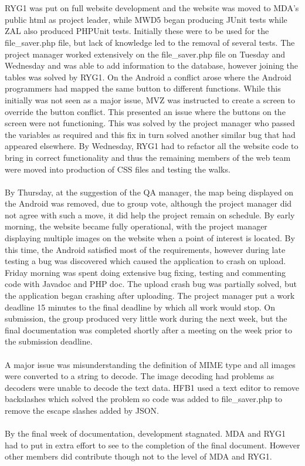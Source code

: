 \documentclass[12pt]{article}
\begin{document}
\\\\
RYG1 was put on full website development and the website was moved to MDA's public html as project leader, while MWD5 began producing JUnit tests while ZAL also produced PHPUnit tests. Initially these were to be used for the file\_saver.php file, but lack of knowledge led to the removal of several tests. The project manager worked extensively on the file\_saver.php file on Tuesday and Wednesday and was able to add information to the database, however joining the tables was solved by RYG1. On the Android a conflict arose where the Android programmers had mapped the same button to different functions. While this initially was not seen as a major issue, MVZ was instructed to create a screen to override the button conflict. This presented an issue where the buttons on the screen were not functioning. This was solved by the project manager who passed the variables as required and this fix in turn solved another similar bug that had appeared elsewhere. By Wednesday, RYG1 had to refactor all the website code to bring in correct functionality and thus the remaining members of the web team were moved into production of CSS files and testing the walks. \\\\
By Thursday, at the suggestion of the QA manager, the map being displayed on the Android was removed, due to group vote, although the project manager did not agree with such a move, it did help the project remain on schedule. By early morning, the website became fully operational, with the project manager displaying multiple images on the website when a point of interest is located. By this time, the Android satisfied most of the requirements, however during late testing a bug was discovered which caused the application to crash on upload. Friday morning was spent doing extensive bug fixing, testing and commenting code with Javadoc and PHP doc. The upload crash bug was partially solved, but the application began crashing after uploading. The project manager put a work deadline 15 minutes to the final deadline by which all work would stop. On submission, the group produced very little work during the next week, but the final documentation was completed shortly after a meeting on the week prior to the submission deadline.
\\\\
A major issue was misunderstanding the definition of MIME type and all images were converted to a string to decode. The image decoding had problems as decoders were unable to decode the text data. HFB1 used a text editor to remove backslashes which solved the problem so code was added to file\_saver.php to remove the escape slashes added by JSON.
\\\\
By the final week of documentation, development stagnated. MDA and RYG1 had to put in extra effort to see to the completion of the final document. However other members did contribute though not to the level of MDA and RYG1.
\newpage 
\end{document}
